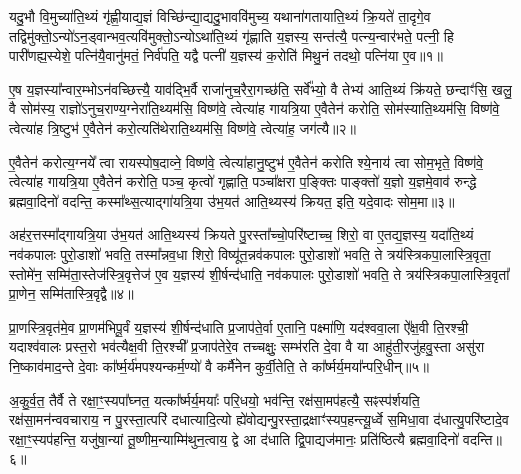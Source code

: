 \setcounter{anuvakam}{0}
यदु॒भौ वि॒मुच्या॑ति॒थ्यं गृ॑ह्णी॒याद्य॒ज्ञं विच्छि॑न्द्या॒द्यदु॒भाववि॑मुच्य॒ यथाना॑गतायाति॒थ्यं क्रि॒यते॑ ता॒दृगे॒व तद्विमु॑क्तो॒\-ऽन्यो॑\-ऽन॒ड्वान्भव॒त्यवि॑मुक्तो॒\-ऽन्यो\-ऽथा॑ति॒थ्यं गृ॑ह्णाति य॒ज्ञस्य॒ सन्त॑त्यै॒ पत्न्य॒न्वार॑भते॒ पत्नी॒ हि पारी॑णह्य॒स्येशे॒ पत्नि॑यै॒वानु॑मतं॒ निर्व॑पति॒ यद्वै पत्नी॑ य॒ज्ञस्य॑ क॒रोति॑ मिथु॒नं तदथो॒ पत्नि॑या ए॒व॥१॥

ए॒ष य॒ज्ञस्या᳚न्वार॒म्भो\-ऽन॑वच्छित्त्यै॒ याव॑द्भि॒र्वै राजा॑नुच॒रैरा॒गच्छ॑ति॒ सर्वे᳚भ्यो॒ वै तेभ्य॑ आति॒थ्यं क्रि॑यते॒ छन्दाꣳ॑सि॒ खलु॒ वै सोम॑स्य॒ राज्ञो॑\-ऽनुच॒राण्य॒ग्नेरा॑ति॒थ्यम॑सि॒ विष्ण॑वे॒ त्वेत्या॑ह गायत्रि॒या ए॒वैतेन॑ करोति॒ सोम॑स्याति॒थ्यम॑सि॒ विष्ण॑वे॒ त्वेत्या॑ह त्रि॒ष्टुभ॑ ए॒वैतेन॑ करो॒त्यति॑थेराति॒थ्यम॑सि॒ विष्ण॑वे॒ त्वेत्या॑ह॒ जग॑त्यै॥२॥

ए॒वैतेन॑ करोत्य॒ग्नये᳚ त्वा रायस्पोष॒दाव्ने॒ विष्ण॑वे॒ त्वेत्या॑हानु॒ष्टुभ॑ ए॒वैतेन॑ करोति श्ये॒नाय॑ त्वा सोम॒भृते॒ विष्ण॑वे॒ त्वेत्या॑ह गायत्रि॒या ए॒वैतेन॑ करोति॒ पञ्च॒ कृत्वो॑ गृह्णाति॒ पञ्चा᳚क्षरा प॒ङ्क्तिः पाङ्क्तो॑ य॒ज्ञो य॒ज्ञमे॒वाव॑ रुन्द्धे ब्रह्मवा॒दिनो॑ वदन्ति॒ कस्मा᳚थ्स॒त्याद्गा॑यत्रि॒या उ॑भ॒यत॑ आति॒थ्यस्य॑ क्रियत॒ इति॒ यदे॒वादः सोम॒मा॥३॥

अह॑र॒त्तस्मा᳚द्गायत्रि॒या उ॑भ॒यत॑ आति॒थ्यस्य॑ क्रियते पु॒रस्ता᳚च्चो॒परि॑ष्टाच्च॒ शिरो॒ वा ए॒तद्य॒ज्ञस्य॒ यदा॑ति॒थ्यं नव॑कपालः पुरो॒डाशो॑ भवति॒ तस्मा᳚न्नव॒धा शिरो॒ विष्यू॑त॒न्नव॑कपालः पुरो॒डाशो॑ भवति॒ ते त्रय॑स्त्रिकपा॒लास्त्रि॒वृता॒ स्तोमे॑न॒ सम्मि॑ता॒स्तेज॑स्त्रि॒वृत्तेज॑ ए॒व य॒ज्ञस्य॑ शी॒र्\mbox{}षन्द॑धाति॒ नव॑कपालः पुरो॒डाशो॑ भवति॒ ते त्रय॑स्त्रिकपा॒लास्त्रि॒वृता᳚ प्रा॒णेन॒ सम्मि॑तास्त्रि॒वृद्वै॥४॥

प्रा॒णस्त्रि॒वृत॑मे॒व प्रा॒णम॑भिपू॒र्वं य॒ज्ञस्य॑ शी॒र्\mbox{}षन्द॑धाति प्र॒जाप॑ते॒र्वा ए॒तानि॒ पक्ष्मा॑णि॒ यद॑श्ववा॒ला ऐ᳚क्ष॒वी ति॒रश्ची॒ यदाश्व॑वालः प्रस्त॒रो भव॑त्यैक्ष॒वी ति॒रश्ची᳚ प्र॒जाप॑तेरे॒व तच्चक्षुः॒ सम्भ॑रति दे॒वा वै या आहु॑ती॒रजु॑हवु॒स्ता असु॑रा नि॒ष्काव॑माद॒न्ते दे॒वाः का᳚र्\mbox{}ष्म॒र्य॑मपश्यन्कर्म॒ण्यो॑ वै कर्मै॑नेन कुर्वी॒तेति॒ ते का᳚र्ष्मर्य॒मया᳚न्परि॒धीन्॥५॥

अ॒कु॒र्व॒त॒ तैर्वै ते रक्षा॒ꣳ॒स्यपा᳚घ्नत॒ यत्का᳚र्ष्मर्य॒मयाः᳚ परि॒धयो॒ भव॑न्ति॒ रक्ष॑सा॒मप॑हत्यै॒ सꣴस्प॑र्शयति॒ रक्ष॑सा॒मन॑न्ववचाराय॒ न पु॒रस्ता॒त्परि॑ दधात्यादि॒त्यो ह्ये॑वोद्यन्पु॒रस्ता॒द्रक्षाꣳ॑स्यप॒हन्त्यू॒र्ध्वे स॒मिधा॒वा द॑धात्यु॒परि॑ष्टादे॒व रक्षा॒ꣳ॒स्यप॑हन्ति॒ यजु॑षा॒न्यां तू॒ष्णीम॒न्याम्मि॑थुन॒त्वाय॒ द्वे आ द॑धाति द्वि॒पाद्यज॑मानः॒ प्रति॑ष्ठित्यै ब्रह्मवा॒दिनो॑ वदन्ति॥६॥

